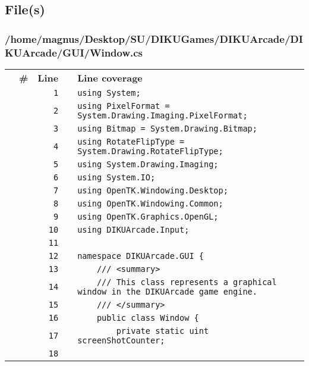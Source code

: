 \documentclass[a4paper,landscape,10pt]{article}
\begin{document}
\subsection{File(s)}
\subsubsection{/home/magnus/Desktop/SU/DIKUGames/DIKUArcade/DIKUArcade/GUI/Window.cs}
\begin{longtable}[l]{lrrll}
\textbf{} & \textbf{\#} & \textbf{Line} & \textbf{} & \textbf{Line coverage}\\
\cellcolor{gray} &  & \verb~1~ & & \verb~using System;~\\
\cellcolor{gray} &  & \verb~2~ & & \verb~using PixelFormat = System.Drawing.Imaging.PixelFormat;~\\
\cellcolor{gray} &  & \verb~3~ & & \verb~using Bitmap = System.Drawing.Bitmap;~\\
\cellcolor{gray} &  & \verb~4~ & & \verb~using RotateFlipType = System.Drawing.RotateFlipType;~\\
\cellcolor{gray} &  & \verb~5~ & & \verb~using System.Drawing.Imaging;~\\
\cellcolor{gray} &  & \verb~6~ & & \verb~using System.IO;~\\
\cellcolor{gray} &  & \verb~7~ & & \verb~using OpenTK.Windowing.Desktop;~\\
\cellcolor{gray} &  & \verb~8~ & & \verb~using OpenTK.Windowing.Common;~\\
\cellcolor{gray} &  & \verb~9~ & & \verb~using OpenTK.Graphics.OpenGL;~\\
\cellcolor{gray} &  & \verb~10~ & & \verb~using DIKUArcade.Input;~\\
\cellcolor{gray} &  & \verb~11~ & & \verb~~\\
\cellcolor{gray} &  & \verb~12~ & & \verb~namespace DIKUArcade.GUI {~\\
\cellcolor{gray} &  & \verb~13~ & & \verb~    /// <summary>~\\
\cellcolor{gray} &  & \verb~14~ & & \verb~    /// This class represents a graphical window in the DIKUArcade game engine.~\\
\cellcolor{gray} &  & \verb~15~ & & \verb~    /// </summary>~\\
\cellcolor{gray} &  & \verb~16~ & & \verb~    public class Window {~\\
\cellcolor{gray} &  & \verb~17~ & & \verb~        private static uint screenShotCounter;~\\
\cellcolor{gray} &  & \verb~18~ & & \verb~~\\

\end{longtable}
\end{document}
